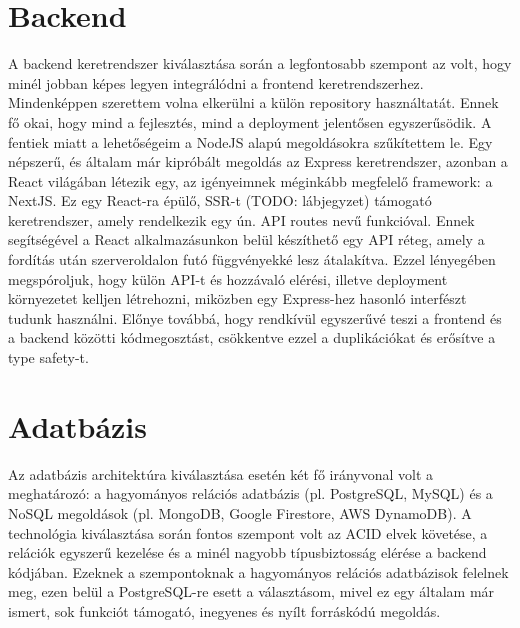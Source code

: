 \section{Backend}
A backend keretrendszer kiválasztása során a legfontosabb szempont az volt, hogy minél jobban képes legyen integrálódni a frontend keretrendszerhez.
Mindenképpen szerettem volna elkerülni a külön repository használtatát. Ennek fő okai, hogy mind a fejlesztés, mind a deployment jelentősen egyszerűsödik.
A fentiek miatt a lehetőségeim a NodeJS alapú megoldásokra szűkítettem le. Egy népszerű, és általam már kipróbált megoldás az Express keretrendszer, azonban a React világában létezik egy, az igényeimnek méginkább megfelelő framework: a NextJS.
Ez egy React-ra épülő, SSR-t (TODO: lábjegyzet) támogató keretrendszer, amely rendelkezik egy ún. API routes nevű funkcióval.
Ennek segítségével a React alkalmazásunkon belül készíthető egy API réteg, amely a fordítás után szerveroldalon futó függvényekké lesz átalakítva.
Ezzel lényegében megspóroljuk, hogy külön API-t és hozzávaló elérési, illetve deployment környezetet kelljen létrehozni, miközben egy Express-hez hasonló interfészt tudunk használni.
Előnye továbbá, hogy rendkívül egyszerűvé teszi a frontend és a backend közötti kódmegosztást, csökkentve ezzel a duplikációkat és erősítve a type safety-t.

\section{Adatbázis}
Az adatbázis architektúra kiválasztása esetén két fő irányvonal volt a meghatározó: a hagyományos relációs adatbázis (pl. PostgreSQL, MySQL) és a NoSQL megoldások (pl. MongoDB, Google Firestore, AWS DynamoDB).
A technológia kiválasztása során fontos szempont volt az ACID elvek követése, a relációk egyszerű kezelése és a minél nagyobb típusbiztosság elérése a backend kódjában.
Ezeknek a szempontoknak a hagyományos relációs adatbázisok felelnek meg, ezen belül a PostgreSQL-re esett a választásom, mivel ez egy általam már ismert, sok funkciót támogató, inegyenes és nyílt forráskódú megoldás.

